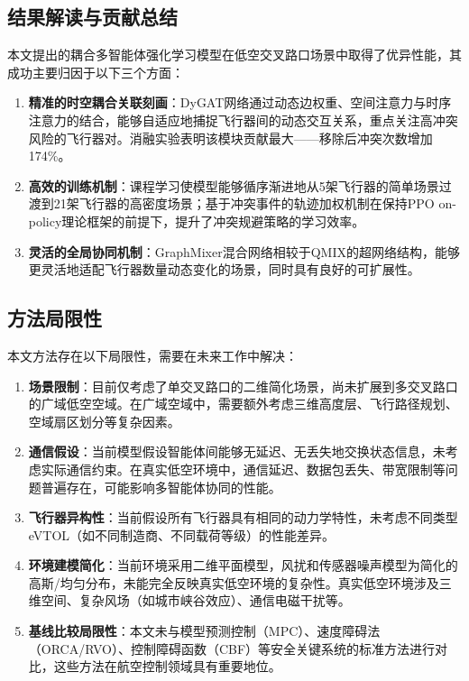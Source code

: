 \documentclass[12pt,a4paper,UTF8]{ctexart}
\begin{document}
\subsection{结果解读与贡献总结}
本文提出的耦合多智能体强化学习模型在低空交叉路口场景中取得了优异性能，其成功主要归因于以下三个方面：
\begin{enumerate}[label=(\arabic*)]
    \item \textbf{精准的时空耦合关联刻画}：DyGAT网络通过动态边权重、空间注意力与时序注意力的结合，能够自适应地捕捉飞行器间的动态交互关系，重点关注高冲突风险的飞行器对。消融实验表明该模块贡献最大——移除后冲突次数增加174\%。
    \item \textbf{高效的训练机制}：课程学习使模型能够循序渐进地从5架飞行器的简单场景过渡到21架飞行器的高密度场景；基于冲突事件的轨迹加权机制在保持PPO on-policy理论框架的前提下，提升了冲突规避策略的学习效率。
    \item \textbf{灵活的全局协同机制}：GraphMixer混合网络相较于QMIX的超网络结构，能够更灵活地适配飞行器数量动态变化的场景，同时具有良好的可扩展性。
\end{enumerate}

\subsection{方法局限性}
本文方法存在以下局限性，需要在未来工作中解决：
\begin{enumerate}[label=(\arabic*)]
    \item \textbf{场景限制}：目前仅考虑了单交叉路口的二维简化场景，尚未扩展到多交叉路口的广域低空空域。在广域空域中，需要额外考虑三维高度层、飞行路径规划、空域扇区划分等复杂因素。
    \item \textbf{通信假设}：当前模型假设智能体间能够无延迟、无丢失地交换状态信息，未考虑实际通信约束。在真实低空环境中，通信延迟、数据包丢失、带宽限制等问题普遍存在，可能影响多智能体协同的性能。
    \item \textbf{飞行器异构性}：当前假设所有飞行器具有相同的动力学特性，未考虑不同类型eVTOL（如不同制造商、不同载荷等级）的性能差异。
    \item \textbf{环境建模简化}：当前环境采用二维平面模型，风扰和传感器噪声模型为简化的高斯/均匀分布，未能完全反映真实低空环境的复杂性。真实低空环境涉及三维空间、复杂风场（如城市峡谷效应）、通信电磁干扰等。
    \item \textbf{基线比较局限性}：本文未与模型预测控制（MPC）、速度障碍法（ORCA/RVO）、控制障碍函数（CBF）等安全关键系统的标准方法进行对比，这些方法在航空控制领域具有重要地位。
\end{enumerate}
\end{document}
